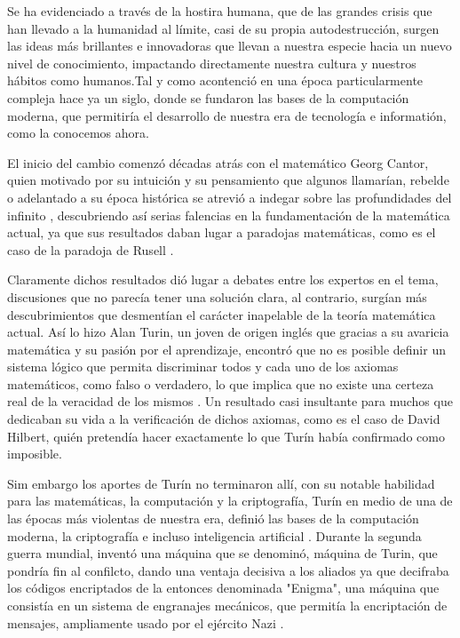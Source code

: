 \documentclass[12pt,a4paper]{report}
\begin{document}
    \vspace{1cm}
       Se ha evidenciado a través de la hostira humana, que de las grandes crisis que han llevado a la humanidad al límite, casi de su propia autodestrucción, surgen las ideas más brillantes e innovadoras que llevan a nuestra especie hacia un nuevo nivel de conocimiento, impactando directamente nuestra cultura y nuestros hábitos como humanos.Tal y como acontenció en una época particularmente compleja hace ya un siglo, donde se fundaron las bases de la computación moderna, que permitiría el desarrollo de nuestra era de tecnología e informatión, como la conocemos ahora.
       
    \vspace{1cm}
        El inicio del cambio comenzó décadas atrás con el matemático Georg Cantor, quien motivado por su intuición y su pensamiento que algunos llamarían, rebelde o adelantado a su época histórica se atrevió a indegar sobre las profundidades del infinito \cite{Dauben1979}, descubriendo así serias falencias en la fundamentación de la matemática actual, ya que sus resultados daban lugar a paradojas matemáticas, como es el caso de la paradoja de Rusell \cite{Heijenoort1967}.
    \vspace{1cm}
    
        Claramente dichos resultados dió lugar a debates entre los expertos en el tema, discusiones que no parecía tener una solución clara, al contrario, surgían más descubrimientos que desmentían el carácter inapelable de la teoría matemática actual. Así lo hizo Alan Turin, un joven de origen inglés que gracias a su avaricia matemática y su pasión por el aprendizaje, encontró que no es posible definir un sistema lógico que permita discriminar todos y cada uno de los axiomas matemáticos, como falso o verdadero, lo que implica que no existe una certeza real de la veracidad de los mismos \cite{Turing1936}. Un resultado casi insultante para muchos que dedicaban su vida a la verificación de dichos axiomas, como es el caso de David Hilbert, quién pretendía hacer exactamente lo que Turín había confirmado como imposible.
    
    \vspace{1cm}
        Sim embargo los aportes de Turín no terminaron allí, con su notable habilidad para las matemáticas, la computación y la criptografía, Turín en medio de una de las épocas más violentas de nuestra era, definió las bases de la computación moderna, la criptografía e incluso inteligencia artificial \cite{Turing1950}. Durante la segunda guerra mundial, inventó una máquina que se denominó, máquina de Turin, que pondría fin al confilcto, dando una ventaja decisiva a los aliados ya que decifraba los códigos encriptados de la entonces denominada "Enigma", una máquina que consistía en un sistema de engranajes mecánicos, que permitía la encriptación de mensajes, ampliamente usado por el ejército Nazi \cite{Hodges2014}.
    \vspace{1cm}
    
\end{document}
